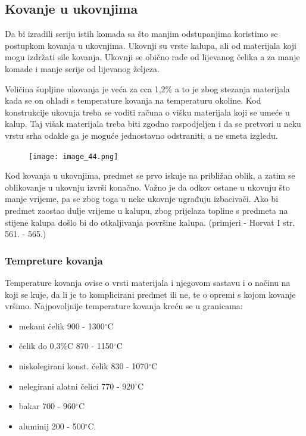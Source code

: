 \documentclass[a4paper,12pt]{article}
\numberwithin{figure}{section}
\begin{document}
\subsection{Kovanje u ukovnjima}
Da bi izradili seriju istih komada sa što manjim odstupanjima koristimo se postupkom kovanja u ukovnjima. Ukovnji su vrste kalupa, ali od materijala koji mogu izdržati sile kovanja. Ukovnji se obično rade od lijevanog čelika a za manje komade i manje serije od lijevanog željeza.\par
Veličina šupljine ukovanja je veća za cca 1,2\% a to je zbog stezanja materijala kada se on ohladi s temperature kovanja na temperaturu okoline. Kod konstrukcije ukovnja treba se voditi računa o višku materijala koji se umeće u kalup. Taj višak materijala treba biti zgodno raspodjeljen i da se pretvori u neku vrstu srha odakle ga je moguće jednostavno odstraniti, a ne smeta izgledu.
\begin{figure}[!h]
\centering
\texttt{[image: image\_44.png]}
\end{figure}
\FloatBarrier
Kod kovanja u ukovnjima, predmet se prvo iskuje na približan oblik, a zatim se oblikovanje u ukovnju izvrši konačno. Važno je da odkov ostane u ukovnju što manje vrijeme, pa se zbog toga u neke ukovnje ugrađuju izbacivači. Ako bi predmet zaostao dulje vrijeme u kalupu, zbog prijelaza topline s predmeta na stijene kalupa došlo bi do otkaljivanja površine kalupa. (primjeri - Horvat I str. 561. - 565.)
\subsubsection{Tempreture kovanja}
Temperature kovanja ovise o vrsti materijala i njegovom sastavu i o načinu na koji se kuje, da li je to komplicirani predmet ili ne, te o opremi s kojom kovanje vršimo. Najpovoljnije temperature kovanja kreću se u granicama:
\begin{itemize}
\item mekani čelik 900 - 1300$^{\circ}$C
\item čelik do 0,3$\%$C 870 - 1150$^{\circ}$C
\item niskolegirani konst. čelik 830 - 1070$^{\circ}$C
\item nelegirani alatni čelici 770 - 920$^{\circ}$C
\item bakar 700 - 960$^{\circ}$C
\item aluminij 200 - 500$^{\circ}$C.
\end{itemize}
\end{document}
